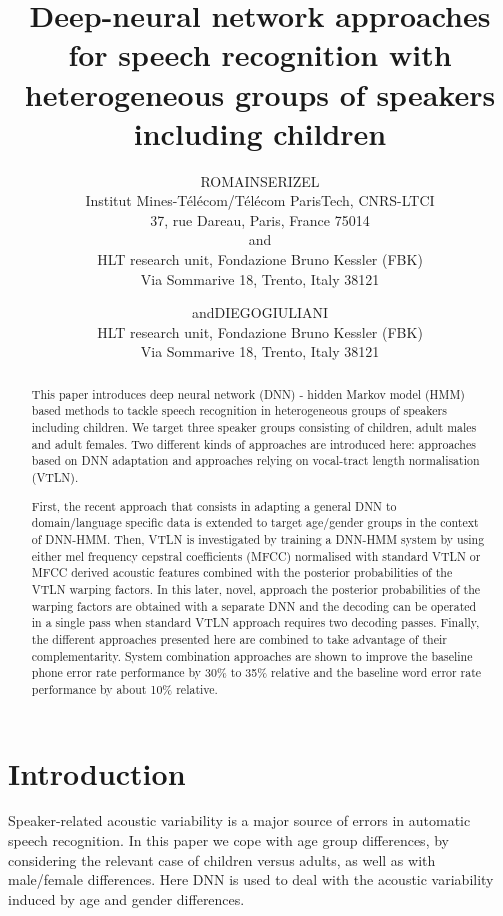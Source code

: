 \documentclass{nle}
\title[DNN approaches for ASR with heterogeneous groups of speakers]{Deep-neural network approaches for speech recognition with heterogeneous groups of speakers including children}
\author[Romain Serizel and Diego Giuliani]{R\ls O\ls M\ls A\ls I\ls N\ns S\ls E\ls R\ls I\ls Z\ls E\ls L\\
Institut Mines-Télécom/Télécom ParisTech, CNRS-LTCI\\
37, rue Dareau, Paris, France 75014\\
and \\
HLT research unit, Fondazione Bruno Kessler (FBK)\\
Via Sommarive 18, Trento, Italy 38121
\and
and\ns D\ls I\ls E\ls G\ls O\ns G\ls I\ls U\ls L\ls I\ls A\ls N\ls I\\
HLT research unit, Fondazione Bruno Kessler (FBK)\\
Via Sommarive 18, Trento, Italy 38121}
\begin{document}
\label{firstpage}
\maketitle
\begin{abstract} %
This paper introduces deep neural network  (DNN) -  hidden  Markov model (HMM) based methods to tackle speech recognition in heterogeneous groups of speakers including children. We target three speaker groups consisting of children, adult males and adult females. Two different kinds of approaches are introduced here: approaches based on DNN adaptation and approaches relying on vocal-tract length normalisation (VTLN).

First, the recent approach that consists
in adapting a general DNN to domain/language specific data is extended
to target  age/gender groups  in the context  of DNN-HMM. Then, VTLN is investigated by training a DNN-HMM system by using either mel frequency cepstral coefficients (MFCC) normalised with standard VTLN or MFCC derived acoustic features combined with the posterior probabilities of the VTLN warping factors. In this later, novel, approach the posterior probabilities of the warping factors are obtained with a separate DNN and the decoding can be operated in a single pass when standard VTLN approach requires two decoding passes. Finally, the different approaches presented here are combined to take advantage of their complementarity. System combination approaches are shown to improve the baseline phone error rate performance by 30\% to 35\% relative and the baseline word error rate performance by about 10\% relative.
\end{abstract}

\section{Introduction}
Speaker-related  acoustic variability is a major  source of
errors in automatic  speech recognition.  In this  paper we cope
with  age  group differences,  by  considering  the  relevant case  of
children versus adults, as well as with male/female differences. 
Here DNN is used to deal with the acoustic variability induced by  age and gender differences.
\end{document}
